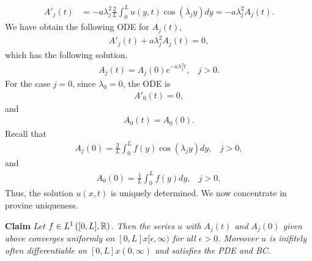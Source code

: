 \begin{questions}
\begin{solution}
\begin{align*}
A'_j(t)&=-a\lambda_j^2\frac{2}{L}\int_0^Lu(y,t)\cos(\lambda_jy)dy=-a\lambda_j^2A_j(t).
\end{align*}
We have obtain the following ODE for $A_j(t)$,
\begin{align*}
A'_j(t)+a\lambda_j^2A_j(t)=0,
\end{align*}
which has the following solution,
\begin{align*}
A_j(t)=A_j(0)e^{-a\lambda_j^2t},~~~~j>0.
\end{align*}
For the case $j=0$, since $\lambda_0=0$, the ODE is
\begin{align*}
A'_0(t)=0,
\end{align*}
and
\begin{align*}
A_0(t)=A_0(0).
\end{align*}
Recall that
\begin{align*}
A_j(0)=\frac{2}{L}\int_0^Lf(y)\cos(\lambda_jy)dy,~~~~j> 0,
\end{align*}
and
\begin{align*}
A_0(0)=\frac{1}{L}\int_0^Lf(y)dy,~~~~j> 0,
\end{align*}
Thus, the solution $u(x,t)$ is uniquely determined. We now concentrate in provine uniqueness.

\textbf{Claim} \textit{Let $f\in L^1\left([0,L],\mathbb{R}\right)$. Then the series $u$ with $A_j(t)$ and $A_j(0)$ given above converges uniformly on $[0,L]x[\epsilon,\infty)$ for all $\epsilon>0$. Moreover $u$ is inifitely often differentiable on $[0,L]x(0,\infty)$ and satisfies the PDE and BC.}


\end{solution}
\end{questions}
